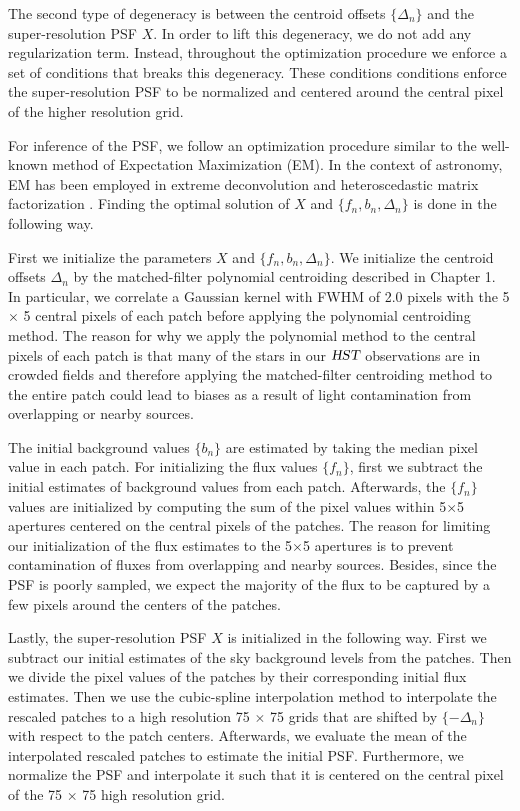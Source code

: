 The second type of degeneracy is between the centroid offsets $\{\Delta_n\}$ and the super-resolution PSF $X$. In order to lift this degeneracy, we do not add any regularization 
term. Instead, throughout the optimization procedure we enforce a set of conditions that breaks this degeneracy. These conditions conditions enforce the super-resolution 
PSF to be normalized and centered around the central pixel of the higher resolution grid. 

For inference of the PSF, we follow an optimization procedure similar to the well-known method of Expectation Maximization (EM). In the context of astronomy, EM has been employed in extreme deconvolution \citep{xd} and heteroscedastic matrix factorization \citep{hmf}. Finding the optimal solution of 
$X$ and $\{f_n , b_n , \Delta_n\}$ is done in the following way. 

First we initialize the parameters $X$ and $\{f_n , b_n , \Delta_n\}$. We initialize the centroid offsets ${\Delta_n}$ by the matched-filter polynomial centroiding 
described in Chapter 1. In particular, we correlate a Gaussian kernel with FWHM of 2.0 pixels with the 5 $\times$ 5 central pixels of each patch before applying 
the polynomial centroiding method. The reason for why we apply the polynomial method to the central pixels of each patch is that many of the stars in our ${\textsl{HST}}$ observations 
are in crowded fields and therefore applying the matched-filter centroiding method to the entire patch could lead to biases as a result of light contamination from overlapping 
or nearby sources. 

The initial background values $\{b_n\}$ are estimated by taking the median pixel value in each patch. For initializing the flux values $\{f_n\}$, first we subtract the initial 
estimates of background values from each patch. Afterwards, the $\{f_n\}$ values are initialized by computing the sum of the pixel values within 5$\times$5 apertures centered on 
the central pixels of the patches. The reason for limiting our initialization of the flux estimates to the 5$\times$5 apertures is to prevent contamination of fluxes from 
overlapping and nearby sources. Besides, since the PSF is poorly sampled, we expect the majority of the flux to be captured by a few pixels around the centers of the patches. 

Lastly, the super-resolution PSF $X$ is initialized in the following way. First we subtract our initial estimates of the sky background levels from the patches. Then we divide the 
pixel values of the patches by their corresponding initial flux estimates. Then we use the cubic-spline interpolation method to interpolate the rescaled patches to a high resolution 
75 $\times$ 75 grids that are shifted by $\{-\Delta_n\}$ with respect to the patch centers. Afterwards, we evaluate the mean of the interpolated rescaled patches 
to estimate the initial PSF. Furthermore, we normalize the PSF and interpolate it such that it is centered on the central pixel of the 75 $\times$ 75 high resolution grid.  


